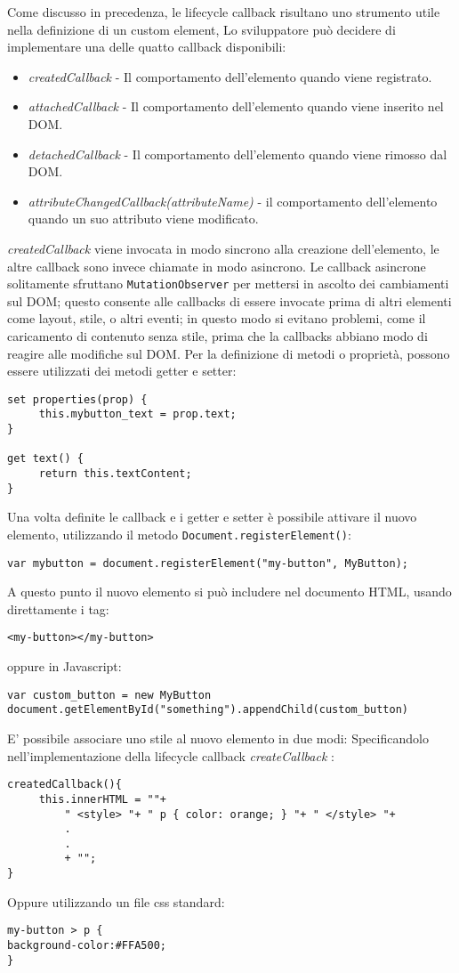 Come discusso in precedenza, le lifecycle callback risultano uno strumento utile nella definizione di un custom element, Lo sviluppatore può decidere di implementare una delle quatto callback disponibili:
\begin{itemize}
\item \emph {createdCallback} - Il comportamento dell’elemento quando viene registrato.
\item \emph {attachedCallback} - Il comportamento dell’elemento quando viene inserito nel DOM.
\item \emph {detachedCallback} - Il comportamento dell’elemento quando viene rimosso dal DOM.
\item \emph {attributeChangedCallback(attributeName)} - il comportamento dell’elemento quando un suo attributo viene modificato.
\end{itemize}
\emph{createdCallback} viene invocata in modo sincrono alla creazione dell’elemento, le altre callback sono invece chiamate in modo asincrono. Le callback asincrone solitamente sfruttano \texttt{MutationObserver} per mettersi in ascolto dei cambiamenti sul DOM; questo consente alle callbacks di essere invocate prima di altri elementi come layout, stile, o altri eventi; in questo modo si evitano problemi, come il caricamento di contenuto senza stile, prima che la callbacks abbiano modo di reagire alle modifiche sul DOM.
Per la definizione di metodi o proprietà, possono essere utilizzati dei metodi getter e setter:
\begin{lstlisting}
set properties(prop) {
     this.mybutton_text = prop.text;
}

get text() {
     return this.textContent;
}
\end{lstlisting}
Una volta definite le callback e i getter e setter è possibile attivare il nuovo elemento, utilizzando il metodo \texttt{Document.registerElement()}:
\begin{lstlisting}
var mybutton = document.registerElement("my-button", MyButton);
\end{lstlisting}
A questo punto il nuovo elemento si può includere nel documento HTML, usando direttamente i tag:
\begin{lstlisting}
<my-button></my-button>
\end{lstlisting}
oppure in Javascript:
\begin{lstlisting}
var custom_button = new MyButton
document.getElementById("something").appendChild(custom_button)
\end{lstlisting}
E’ possibile associare uno stile al nuovo elemento in due modi:
Specificandolo nell’implementazione della lifecycle callback \emph{createCallback} :
\begin{lstlisting}
createdCallback(){ 
     this.innerHTML = ""+ 
         " <style> "+ " p { color: orange; } "+ " </style> "+ 
         .
         .
         + "";
}
\end{lstlisting}
Oppure utilizzando un file css standard:
\begin{lstlisting}
my-button > p { 
background-color:#FFA500;
}
\end{lstlisting}

